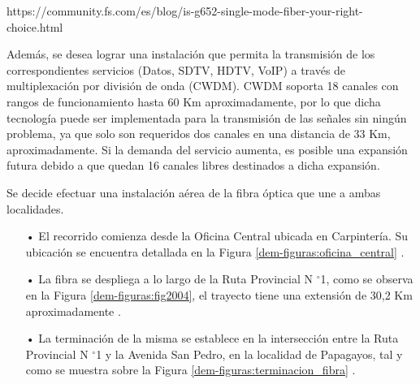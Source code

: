 https://community.fs.com/es/blog/is-g652-single-mode-fiber-your-right-choice.html


Además, se desea lograr una instalación que permita la transmisión de los correspondientes servicios (Datos, SDTV, HDTV, VoIP) a través de multiplexación por división de onda (CWDM). CWDM soporta 18 canales con rangos de funcionamiento hasta 60 Km aproximadamente, por lo que dicha tecnología puede ser implementada para la transmisión de las señales sin ningún problema, ya que solo son requeridos dos canales en una distancia de 33 Km, aproximadamente. Si la demanda del servicio aumenta, es posible una expansión futura  debido a que quedan 16 canales libres destinados a dicha expansión.






Se decide efectuar una instalación aérea de la fibra óptica que une a ambas localidades.
 
 
\begin{itemize} 


\item[•] El recorrido comienza desde la Oficina Central ubicada en Carpintería. Su ubicación se encuentra detallada en la Figura \ref{dem-figuras:oficina_central} . 





\item[•] La fibra se despliega a lo largo de la Ruta Provincial N $^{\circ}$1, como se observa en la Figura \ref{dem-figuras:fig2004}, el trayecto tiene una extensión de 30,2 Km aproximadamente \cite{secretaria}.


\item[•] La terminación de la misma se establece en la intersección entre la Ruta Provincial N $^{\circ}$1 y la Avenida San Pedro, en la localidad de Papagayos, tal y como se muestra sobre la Figura \ref{dem-figuras:terminacion_fibra} .

\end{itemize}

 


